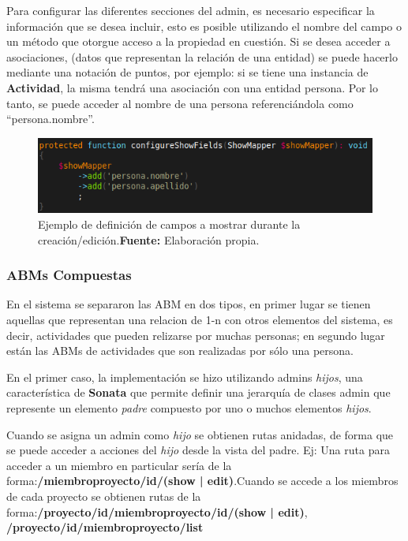 Para configurar las diferentes secciones del admin, es necesario especificar la información que se desea incluir, esto es posible utilizando el nombre del campo
o un método que otorgue acceso a la propiedad en cuestión\@. Si se desea acceder a asociaciones, (datos que representan la relación de una entidad) se puede hacerlo mediante una notación de puntos, por ejemplo:
si se tiene una instancia de \textbf{Actividad}, la misma tendrá una asociación con una entidad persona\@. Por lo tanto, se puede acceder al nombre de una
persona referenciándola como ``persona.nombre''.
\begin{figure}[H]
    \includegraphics[width=1\linewidth]{image/show.png}
    \caption[Ejemplo de definición de campos a mostrar durante la creación/edición]{Ejemplo de definición de campos a mostrar durante la creación/edición.\newline \textbf{Fuente:} Elaboración propia.}
    \label{fig:image/show}
\end{figure}


\subsubsection{ABMs Compuestas}%
\label{ssub:admin_proyectadmin_proyecto}

En el sistema se separaron las ABM en dos tipos, en primer lugar se tienen aquellas que representan una relacion de 1-n con otros elementos del sistema,
es decir, actividades que pueden relizarse por muchas personas; en segundo lugar están las ABMs de actividades que son realizadas por sólo una persona.


En el primer caso, la implementación se hizo utilizando admins \textit{hijos}, una característica de \textbf{Sonata} que permite definir una jerarquía de clases admin que represente un
elemento \textit{padre} compuesto por uno o muchos elementos \textit{hijos}.

Cuando se asigna un admin como \textit{hijo} se obtienen rutas anidadas, de forma que se puede acceder a acciones del \textit{hijo} desde la vista del padre.
Ej: Una ruta
para acceder a un miembro en particular sería de la forma:\newline \textbf{/miembroproyecto/{id}/(show | edit)}\@.\newline\newline Cuando se accede a los
miembros de cada proyecto se obtienen rutas de la forma:\newline \textbf{/proyecto/{id}/miembroproyecto/{id}/(show | edit)},
\newline \textbf{/proyecto/{id}/miembroproyecto/list}\newline

